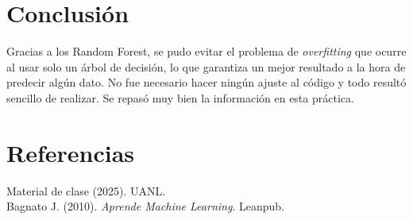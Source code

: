 \documentclass{article}
\begin{document}
\section{Conclusión}
Gracias a los Random Forest, se pudo evitar el problema de \textit{overfitting} que ocurre al usar solo un árbol de decisión, lo que garantiza un mejor resultado a la hora de predecir algún dato. No fue necesario hacer ningún ajuste al código y todo resultó sencillo de realizar. Se repasó muy bien la información en esta práctica.

\section{Referencias}
Material de clase (2025). UANL.\\
Bagnato J. (2010). \textit{Aprende Machine Learning}. Leanpub.
\end{document}
